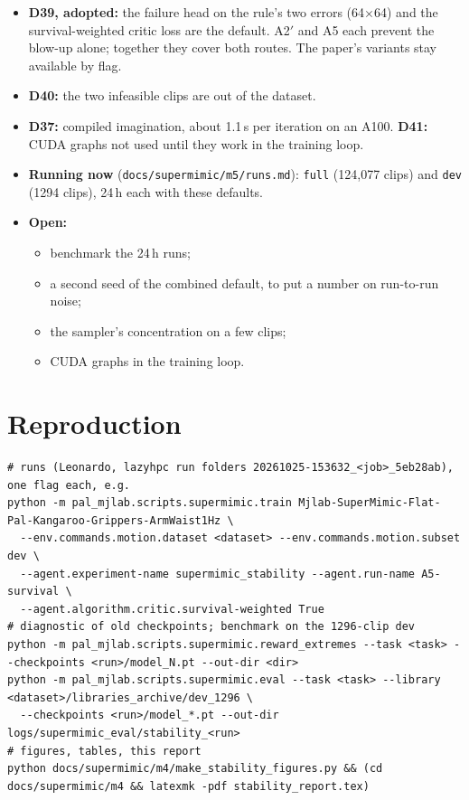 \documentclass[10pt]{article}
\begin{document}
\begin{itemize}
  \item \textbf{D39, adopted:} the failure head on the rule's two errors (64$\times$64) and the
  survival-weighted critic loss are the default. A2$'$ and A5 each prevent the blow-up alone; together
  they cover both routes. The paper's variants stay available by flag.
  \item \textbf{D40:} the two infeasible clips are out of the dataset.
  \item \textbf{D37:} compiled imagination, about 1.1\,s per iteration on an A100. \textbf{D41:} CUDA
  graphs not used until they work in the training loop.
  \item \textbf{Running now} (\texttt{docs/supermimic/m5/runs.md}): \texttt{full} (124,077 clips) and
  \texttt{dev} (1294 clips), 24\,h each with these defaults.
  \item \textbf{Open:}
  \begin{itemize}
    \item benchmark the 24\,h runs;
    \item a second seed of the combined default, to put a number on run-to-run noise;
    \item the sampler's concentration on a few clips;
    \item CUDA graphs in the training loop.
  \end{itemize}
\end{itemize}

\appendix
\section{Reproduction}

\begin{footnotesize}
\begin{verbatim}
# runs (Leonardo, lazyhpc run folders 20261025-153632_<job>_5eb28ab), one flag each, e.g.
python -m pal_mjlab.scripts.supermimic.train Mjlab-SuperMimic-Flat-Pal-Kangaroo-Grippers-ArmWaist1Hz \
  --env.commands.motion.dataset <dataset> --env.commands.motion.subset dev \
  --agent.experiment-name supermimic_stability --agent.run-name A5-survival \
  --agent.algorithm.critic.survival-weighted True
# diagnostic of old checkpoints; benchmark on the 1296-clip dev
python -m pal_mjlab.scripts.supermimic.reward_extremes --task <task> --checkpoints <run>/model_N.pt --out-dir <dir>
python -m pal_mjlab.scripts.supermimic.eval --task <task> --library <dataset>/libraries_archive/dev_1296 \
  --checkpoints <run>/model_*.pt --out-dir logs/supermimic_eval/stability_<run>
# figures, tables, this report
python docs/supermimic/m4/make_stability_figures.py && (cd docs/supermimic/m4 && latexmk -pdf stability_report.tex)
\end{verbatim}
\end{footnotesize}
\end{document}
